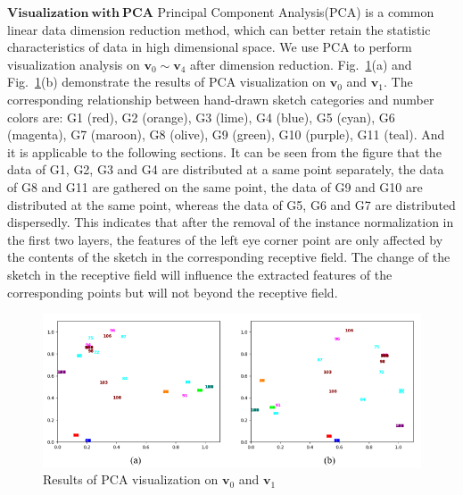 \documentclass[10pt,twocolumn,letterpaper]{article}
\begin{document}
\noindent
$\mathbf{Visualization ~with ~PCA}$ Principal Component Analysis(PCA)\cite{pca} is a common linear data dimension reduction method, which can better retain the statistic characteristics of data in high dimensional space. 
We use PCA to perform visualization analysis on $\boldsymbol{v}_0\sim \boldsymbol{v}_4$ after dimension reduction.
Fig.~\ref{fig:pca_1}(a) and Fig.~\ref{fig:pca_1}(b) demonstrate the results of PCA visualization on $\boldsymbol{v}_0$ and $\boldsymbol{v}_1$. 
The corresponding relationship between hand-drawn sketch categories and number colors are: G1 (red), G2 (orange), G3 (lime), G4 (blue), G5 (cyan), G6 (magenta), G7 (maroon), G8 (olive), G9 (green), G10 (purple), G11 (teal). And it is applicable to the following sections.
It can be seen from the figure that the data of G1, G2, G3 and G4 are distributed at a same point separately, the data of G8 and G11 are gathered on the same point, the data of G9 and G10 are distributed at the same point, whereas the data of G5, G6 and G7 are distributed dispersedly. 
This indicates that after the removal of the instance normalization in the first two layers, the features of the left eye corner point are only affected by the contents of the sketch in the corresponding receptive field. The change of the sketch in the receptive field will influence the extracted features of the corresponding points but will not beyond the receptive field.
\begin{figure}[htb]
	\centering
	\includegraphics[width=0.47 \textwidth]{pca_1.png}
	\caption{Results of PCA visualization on $\boldsymbol{v}_0$ and $\boldsymbol{v}_1$}
	\label{fig:pca_1}
\end{figure}
\end{document}
